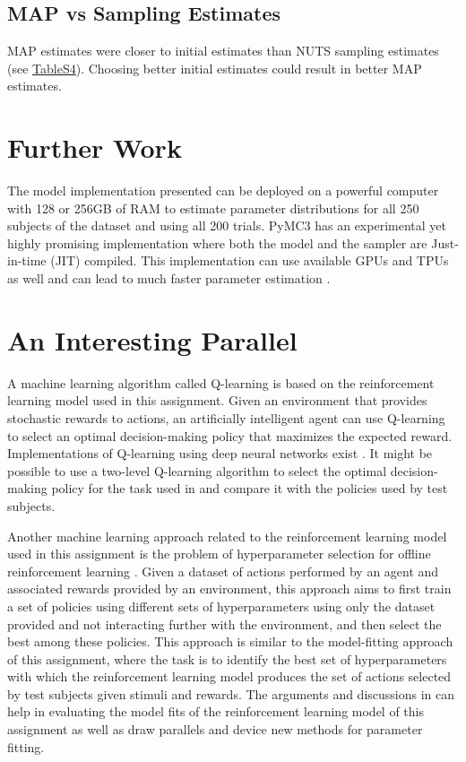 \documentclass[10pt,a4paper]{article}
\begin{document}
\subsection*{MAP vs Sampling Estimates}
MAP estimates were closer to initial estimates than NUTS sampling estimates (see \hyperref[Tables]{TableS4}). Choosing better initial estimates could result in better MAP estimates.
\section*{Further Work}
The model implementation presented can be deployed on a powerful computer with 128 or 256GB of RAM to estimate parameter distributions for all 250 subjects of the dataset and using all 200 trials.
PyMC3 has an experimental yet highly promising implementation where both the model and the sampler are Just-in-time (JIT) compiled. This implementation can use available GPUs and TPUs as well and can lead to much faster parameter estimation \citep{website:jax}.

\section*{An Interesting Parallel}
A machine learning algorithm called Q-learning \citep{website:qlearn} is based on the reinforcement learning model used in this assignment. Given an environment that provides stochastic rewards to actions, an artificially intelligent agent can use Q-learning to select an optimal decision-making policy that maximizes the expected reward. Implementations of Q-learning using deep neural networks exist \citep{website:qlearn-deep}. It might be possible to use a two-level Q-learning algorithm to select the optimal decision-making policy for the task used in \cite{Gillan2016} and compare it with the policies used by test subjects.

Another machine learning approach related to the reinforcement learning model used in this assignment is the problem of hyperparameter selection for offline reinforcement learning \citep{hyperselect}. Given a dataset of actions performed by an agent and associated rewards provided by an environment, this approach aims to first train a set of policies using different sets of hyperparameters using only the dataset provided and not interacting further with the environment, and then select the best among these policies. This approach is similar to the model-fitting approach of this assignment, where the task is to identify the best set of hyperparameters with which the reinforcement learning model produces the set of actions selected by test subjects given stimuli and rewards. The arguments and discussions in \cite{hyperselect} can help in evaluating the model fits of the reinforcement learning model of this assignment as well as draw parallels and device new methods for parameter fitting.
\end{document}
